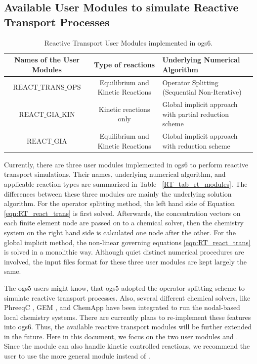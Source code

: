 \subsection{Available User Modules to simulate Reactive Transport Processes}

\begin{table}
\label{tab:RT_tab_rt_modules}
\caption{Reactive Transport User Modules implemented in ogs6. }
\begin{tabular}{c c p{5.5cm}}
\hline
Names of the User Modules    & Type of reactions & Underlying Numerical Algorithm \\
\hline
$\mathrm{REACT\_TRANS\_OPS}$      & Equilibrium and Kinetic Reactions    & Operator Splitting (Sequential Non-Iterative)      \\
$\mathrm{REACT\_GIA\_KIN}$        & Kinetic reactions only     & Global implicit approach with partial reduction scheme      \\
$\mathrm{REACT\_GIA}$            & Equilibrium and Kinetic Reactions     & Global implicit approach with reduction scheme      \\
\hline
\end{tabular}
\end{table}

Currently, there are three user modules implemented in ogs6 to perform reactive transport simulations. Their names, underlying numerical algorithm, and applicable reaction types are summarized in Table ~\ref{RT_tab_rt_modules}. The differences between these three modules are mainly the underlying solution algorithm. For the operator splitting method, the left hand side of Equation \ref{eqn:RT_react_trans} is first solved. Afterwards, the concentration vectors on each finite element node are passed on to a chemical solver, then the chemistry system on the right hand side is calculated one node after the other. For the global implicit method, the non-linear governing equations \ref{eqn:RT_react_trans} is solved in a monolithic way. Although quiet distinct numerical procedures are involved, the input files format for these three user modules are kept largely the same. 

The ogs5 users might know, that ogs5 adopted the operator splitting scheme to simulate reactive transport processes. Also, several different chemical solvers, like PhreeqC \cite{Xie2006}, GEM \cite{Shao2009}, and ChemApp \cite{Graupner2011} have been integrated to run the nodal-based local chemistry systems. There are currently plans to re-implement these features into ogs6. Thus, the available reactive transport modules will be further extended in the future. Here in this document, we focus on the two user modules  and . Since the  module can also handle kinetic controlled reactions, we recommend the user to use the more general module  instead of . 

